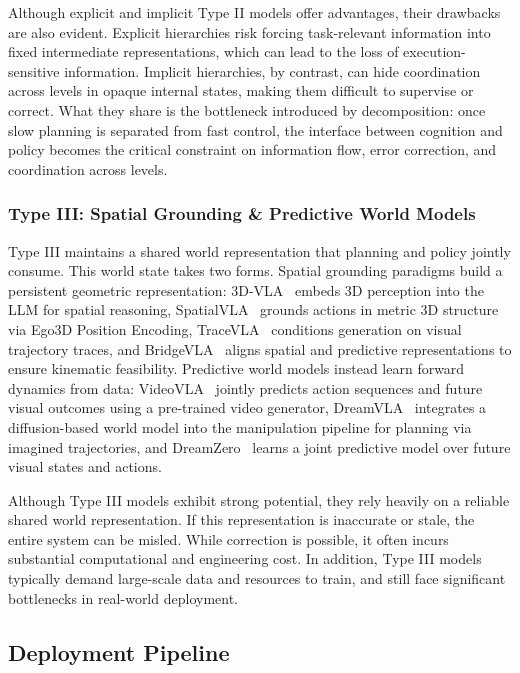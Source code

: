 \documentclass[acmsmall,screen,review]{acmart}
\begin{document}
Although explicit and implicit Type II models offer advantages, their drawbacks are also evident.
Explicit hierarchies risk forcing task-relevant information into fixed intermediate representations, which can lead to the loss of execution-sensitive information.
Implicit hierarchies, by contrast, can hide coordination across levels in opaque internal states, making them difficult to supervise or correct.
What they share is the bottleneck introduced by decomposition: once slow planning is separated from fast control, the interface between cognition and policy becomes the critical constraint on information flow, error correction, and coordination across levels.

\subsubsection{Type III\@: Spatial Grounding \& Predictive World Models}\label{subsec:spatial_world_models}

Type III maintains a shared world representation that planning and policy jointly consume. 
This world state takes two forms. 
Spatial grounding paradigms build a persistent geometric representation: 3D-VLA~\cite{zhen20243dvla} embeds 3D perception into the LLM for spatial reasoning, SpatialVLA~\cite{qu2025spatialvla} grounds actions in metric 3D structure via Ego3D Position Encoding, TraceVLA~\cite{zheng2025tracevla} conditions generation on visual trajectory traces, and BridgeVLA~\cite{li2025bridgevla} aligns spatial and predictive representations to ensure kinematic feasibility. 
Predictive world models instead learn forward dynamics from data: VideoVLA~\cite{shen2025videovla} jointly predicts action sequences and future visual outcomes using a pre-trained video generator, DreamVLA~\cite{zhang2025dreamvla} integrates a diffusion-based world model into the manipulation pipeline for planning via imagined trajectories, and DreamZero~\cite{ye2026dreamzero} learns a joint predictive model over future visual states and actions.

Although Type III models exhibit strong potential, they rely heavily on a reliable shared world representation. 
If this representation is inaccurate or stale, the entire system can be misled. 
While correction is possible, it often incurs substantial computational and engineering cost. 
In addition, Type III models typically demand large-scale data and resources to train, and still face significant bottlenecks in real-world deployment.

\subsection{Deployment Pipeline}\label{sec:deployment_pipeline}
\end{document}
